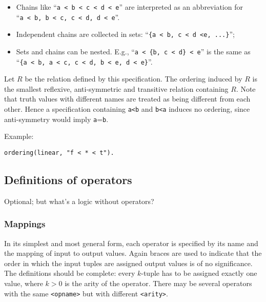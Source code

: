 \documentclass[]{article}
\providecommand{\tightlist}{%
  \setlength{\itemsep}{0pt}\setlength{\parskip}{0pt}}
\begin{document}
\begin{itemize}
\tightlist
\item
  Chains like
  ``\texttt{a\ \textless{}\ b\ \textless{}\ c\ \textless{}\ d\ \textless{}\ e}''
  are interpreted as an abbreviation for
  ``\texttt{a\ \textless{}\ b,\ b\ \textless{}\ c,\ c\ \textless{}\ d,\ d\ \textless{}\ e}''.
\item
  Independent chains are collected in sets:
  ``\texttt{\{a\ \textless{}\ b,\ c\ \textless{}\ d\ \textless{}e,\ ...\}}'';
\item
  Sets and chains can be nested. E.g.,
  ``\texttt{a\ \textless{}\ \{b,\ c\ \textless{}\ d\}\ \textless{}\ e}''
  is the same as
  ``\texttt{\{a\ \textless{}\ b,\ a\ \textless{}\ c,\ c\ \textless{}\ d,\ b\ \textless{}\ e,\ d\ \textless{}\ e\}}''.
\end{itemize}

Let \(R\) be the relation defined by this specification. The ordering
induced by \(R\) is the smallest reflexive, anti-symmetric and
transitive relation containing \(R\). Note that truth values with
different names are treated as being different from each other. Hence a
specification containing \texttt{a\textless{}b} and
\texttt{b\textless{}a} induces no ordering, since anti-symmetry would
imply \texttt{a}=\texttt{b}.

Example:

\begin{verbatim}
ordering(linear, "f < * < t").
\end{verbatim}

\hypertarget{definitions-of-operators}{%
\subsection{Definitions of operators}\label{definitions-of-operators}}

Optional; but what's a logic without operators?

\hypertarget{mappings}{%
\subsubsection{Mappings}\label{mappings}}

In its simplest and most general form, each operator is specified by its
name and the mapping of input to output values. Again braces are used to
indicate that the order in which the input tuples are assigned output
values is of no significance. The definitions should be complete: every
\(k\)-tuple has to be assigned exactly one value, where \(k>0\) is the
arity of the operator. There may be several operators with the same
\texttt{\textless{}opname\textgreater{}} but with different
\texttt{\textless{}arity\textgreater{}}.
\end{document}
